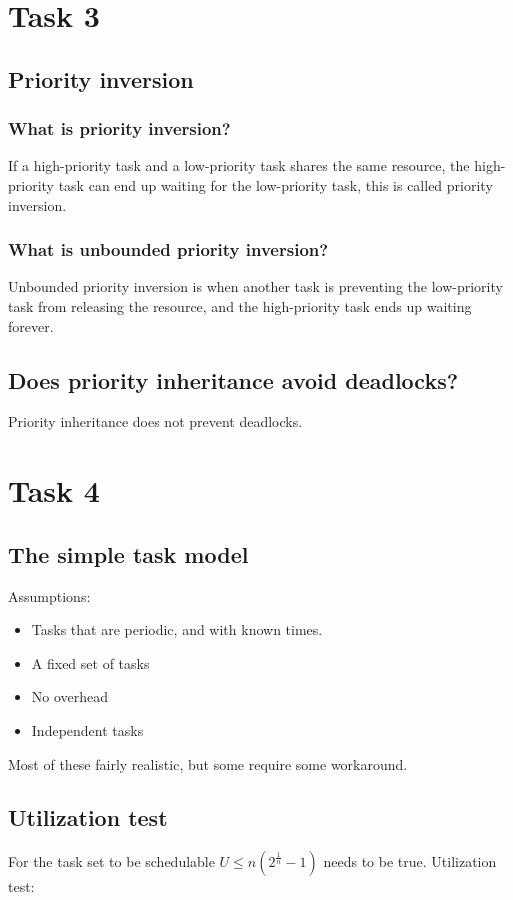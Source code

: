 \documentclass[11pt]{article}
\begin{document}
\section{Task 3}
\label{sec-3}
\subsection{Priority inversion}
\label{sec-3-1}
\subsubsection{What is priority inversion?}
\label{sec-3-1-1}
If a high-priority task and a low-priority task shares the same resource, the high-priority task can end up waiting for the low-priority task, this is called priority inversion.
\subsubsection{What is unbounded priority inversion?}
\label{sec-3-1-2}
Unbounded priority inversion is when another task is preventing the low-priority task from releasing the resource, and the high-priority task ends up waiting forever.

\subsection{Does priority inheritance avoid deadlocks?}
\label{sec-3-2}
Priority inheritance does not prevent deadlocks.

\section{Task 4}
\label{sec-4}
\subsection{The simple task model}
\label{sec-4-1}
Assumptions:
\begin{itemize}
\item Tasks that are periodic, and with known times.
\item A fixed set of tasks
\item No overhead
\item Independent tasks
\end{itemize}
Most of these fairly realistic, but some require some workaround.

\subsection{Utilization test}
\label{sec-4-2}
For the task set to be schedulable \( U \leq n(2^{\frac{1}{n}} - 1) \) needs to be true.
Utilization test:
\end{document}
